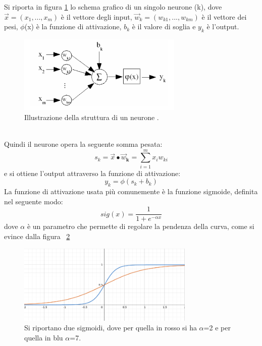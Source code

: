 Si riporta in figura \ref{schema_neurone} lo schema grafico di un singolo neurone (k), dove $\vec{x} = (x_1 ,..., x_m)$ è il vettore degli input, $\vec{w}_k = (w_{k1} ,..., w_{km})$ è il vettore dei pesi, $\phi$(x) è la funzione di attivazione, $b_k$ è il valore di soglia e $y_k$ è l'output.
\begin{figure}[h!]
	\centering
	\includegraphics[width=0.70\textwidth]{figs/schema_neurone.png}
	\caption{Illustrazione della struttura di un neurone \cite{Intro_retiN}.}
	\label{schema_neurone}	
\end{figure} \\
Quindi il neurone opera la seguente somma pesata:
\begin{equation}
s_k = \vec{x}\bullet\vec{w}_\textbf{k} = \sum_{i=1}^{m}x_iw_{ki}
\label{sk}
\end{equation}
e si ottiene l'output attraverso la funzione di attivazione: 
\begin{equation}
y_k = \phi(s_k + b_k)
\end{equation}
La funzione di attivazione usata più comunemente è la funzione sigmoide, definita nel seguente modo:
\begin{equation}
sig(x) = \frac{1}{1 + e^{-{\alpha}x}}
\end{equation} 
dove $\alpha$ è un parametro che permette di regolare la pendenza della curva, come si evince dalla figura ~\ref{sigmoide}
\begin{figure}[h!]
	\centering
	\includegraphics[width=0.75\textwidth]{figs/sigmoide.png}
	\caption{Si riportano due sigmoidi, dove per quella in rosso si ha $\alpha$=2 e per quella in blu $\alpha$=7.}
	\label{sigmoide}
\end{figure}
